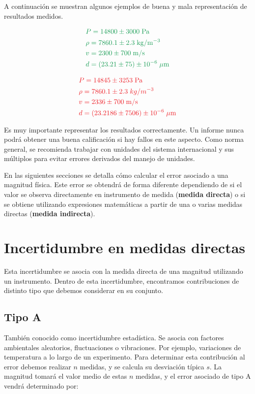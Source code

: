 \documentclass{book}
\begin{document}
A continuación se muestran algunos ejemplos de buena y mala representación de resultados medidos.

\begin{equation}
  \begin{aligned}
    & \color{ForestGreen} P = 14800 \pm 3000 \; \mathrm{Pa} \\
    & \color{ForestGreen} \rho = 7860.1 \pm 2.3 \; \mathrm{kg / m^{-3}} \\
    & \color{ForestGreen} v = 2300 \pm 700 \; \mathrm{m/s} \\
    & \color {ForestGreen} d = ( 23.21 \pm 75 ) \pm 10^{-6} \; \mathrm{\mu m}
  \end{aligned}
\end{equation}

\begin{equation}
  \begin{aligned}
    & \color{Red} P = 14845 \pm 3253 \; \mathrm{Pa} \\
    & \color{Red} \rho = 7860.1 \pm 2.3 \; kg / m^{-3} \\
    & \color{Red} v = 2336 \pm 700 \; \mathrm{m/s} \\
    & \color {Red} d = ( 23.2186 \pm 7506 ) \pm 10^{-6} \; \mathrm{\mu m}
  \end{aligned}
\end{equation}


Es muy importante representar los resultados correctamente. Un informe nunca podrá obtener una
buena calificación si hay fallos en este aspecto. Como norma general, se recomienda trabajar con
unidades del sistema internacional y sus múltiplos para evitar errores derivados del manejo de
unidades.

En las siguientes secciones se detalla cómo calcular el error asociado a una magnitud física. 
Este error se obtendrá de forma diferente dependiendo de si el valor se observa directamente en
instrumento de medida (\textbf{medida directa}) o si se obtiene utilizando expresiones matemáticas a partir
de una o varias medidas directas (\textbf{medida indirecta}).


\section{Incertidumbre en medidas directas}
Esta incertidumbre se asocia con la medida directa de una magnitud utilizando un instrumento.
Dentro de esta incertidumbre, encontramos contribuciones de distinto tipo que debemos considerar
en su conjunto.
\subsection{Tipo A}
También conocido como incertidumbre estadística. Se asocia con factores ambientales aleatorios, 
fluctuaciones o vibraciones. Por ejemplo, variaciones de temperatura a lo largo de un experimento.
Para determinar esta contribución al error debemos realizar $n$ medidas, y se calcula su desviación
típica $s$. La magnitud tomará el valor medio de estas $n$ medidas, y el error asociado de tipo A 
vendrá determinado por:
\end{document}

